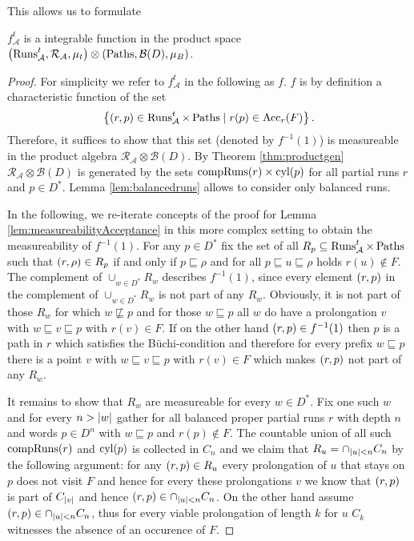 This allows us to formulate
\begin{lemma}
  \cite[Lemma 36]{RandAutoInfTrees}
  $f_{\mathcal{A}}^{t}$ is a integrable function in the product space
  $\left(\operatorname{Runs}_{\mathcal{A}}^{t}, \mathcal{R}_{\mathcal{A}},\mu_{t}\right)\otimes
    \left(\operatorname{Paths}, \mathcal{B}(D), \mu_{B}\right)$.
\end{lemma}
\begin{proof}
  For simplicity we refer to $f_{\mathcal{A}}^{t}$ in the following as $f$.
  $f$ is by definition a characteristic function of the set
  \begin{equation*}
    \left\{\left(r,p\right)\in\operatorname{Runs}_{\mathcal{A}}^{t}\times\operatorname{Paths}\mid
      r(p)\in\operatorname{Acc}_{r}(F)\right\}.
  \end{equation*}
  Therefore, it suffices to show that this set (denoted by $f^{-1}(1)$) is 
  measureable in the product algebra 
  $\mathcal{R}_{\mathcal{A}}\otimes\mathcal{B}(D)$. By Theorem 
  \ref{thm:productgen} $\mathcal{R}_{\mathcal{A}}\otimes\mathcal{B}(D)$ is 
  generated by the sets $\operatorname{compRuns}(r)\times\operatorname{cyl}(p)$ for all partial runs $r$ 
  and $p\in D^{*}$. Lemma \ref{lem:balancedruns} allows to consider only
  balanced runs.

  In the following, we re-iterate concepts of the proof for Lemma 
  \ref{lem:measureabilityAcceptance} in this more complex setting to obtain the
  measureability of $f^{-1}(1)$. For any $p\in D^{*}$ fix the set of all 
  $R_{p}\subseteq\operatorname{Runs}_{\mathcal{A}}^{t}\times\operatorname{Paths}$ such that
  $\left(r,\rho\right)\in R_{p}$ if and only if $p\sqsubseteq\rho$ and for all
  $p\sqsubseteq u\sqsubseteq\rho$ holds $r(u)\notin F$. The complement of
  $\cup_{w\in D^{*}}R_{w}$ describes $f^{-1}(1)$, since every element
  $\left(r,p\right)$ in the complement of $\cup_{w\in D^{*}}R_{w}$ is not part of
  any $R_{w}$. Obviously, it is not part of those $R_{w}$ for which
  $w\not\sqsubseteq p$ and for those $w\sqsubseteq p$ all $w$ do have a
  prolongation $v$ with $w\sqsubseteq v\sqsubseteq p$ with $r(v)\in F$. If on the
  other hand $\left(r,p\right)\in f^{-1}(1)$ then $p$ is a path in $r$ which
  satisfies the Büchi-condition and therefore for every prefix $w\sqsubseteq p$
  there is a point $v$ with $w\sqsubseteq v\sqsubseteq p$ with $r(v)\in F$ which
  makes $\left(r,p\right)$ not part of any $R_{w}$.

  It remains to show that $R_{w}$ are measureable for every $w\in D^{*}$. Fix
  one such $w$ and for every $n>\left\vert{w}\right\vert$ gather for all balanced proper
  partial runs $r$ with depth $n$ and words $p\in D^{n}$ with $w\sqsubseteq p$
  and $r(p)\notin F$. The countable union of all such $\operatorname{compRuns}(r)$ and
  $\operatorname{cyl}(p)$ is collected in $C_{n}$ and we claim that
  $R_{u} = \cap_{\left\vert{u}\right\vert<n}C_{n}$ by the following argument: for any
  $\left(r,p\right)\in R_{u}$ every prolongation of $u$ that stays on $p$ does not
  visit $F$ and hence for every these prolongations $v$ we know that
  $\left(r,p\right)$ is part of $C_{\left\vert{v}\right\vert}$ and hence
  $\left(r,p\right)\in\cap_{\left\vert{u}\right\vert<n}C_{n}$. On the other hand assume
  $\left(r,p\right)\in\cap_{\left\vert{u}\right\vert<n}C_{n}$, thus for every viable prolongation
  of length $k$ for $u$ $C_{k}$ witnesses the absence of an occurence of $F$.


\end{proof}
